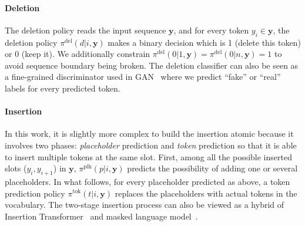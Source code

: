 \documentclass{article}
\begin{document}
\paragraph{Deletion}
The deletion policy reads the input sequence $\bm{y}$, and 
for every token $y_i \in \bm{y}$, the deletion policy $\pi^{\textrm{del}}(d|i, \bm{y})$ makes
a binary decision which is 1 (delete this token) or 0 (keep it). 
We additionally constrain $\pi^{\textrm{del}}(0|1, \bm{y}) = \pi^{\textrm{del}}(0|n, \bm{y})= 1$ to avoid sequence boundary being broken.
The deletion classifier can also be seen as a fine-grained discriminator used in GAN~\citep{goodfellow2014generative} where we predict ``fake'' or ``real'' labels for every predicted token. 
\paragraph{Insertion} In this work, it is slightly more complex to build the insertion atomic because it involves two phases: \emph{placeholder} prediction and \emph{token} prediction so that it is able to insert multiple tokens at the same slot.
First, among all the possible inserted slots ($y_i, y_{i+1}$) in $\bm{y}$, $\pi^{\textrm{plh}}(p|i, \bm{y})$ predicts the possibility of adding one or several placeholders.
In what follows, for every placeholder predicted as above, a token prediction policy $\pi^{\textrm{tok}}(t | i, \bm{y})$ replaces the placeholders with actual tokens in the vocabulary.
The two-stage insertion process can also be viewed as a hybrid of Insertion Transformer~\citep{stern2019insertion} and masked language model~\citep[MLM,][]{devlin2018bert,levy2019constant}.
\end{document}

